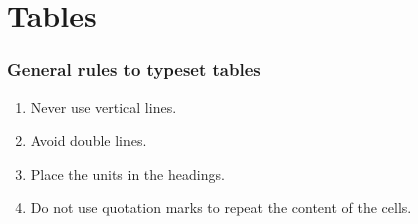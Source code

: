 \documentclass{beamer}
\begin{document}
	\section{Tables}
	\begin{frame}
		\frametitle{General rules to typeset tables}
			\begin{enumerate}
				\item Never use vertical lines.
				\item Avoid double lines.
				\item Place the units in the headings.
				\item Do not use quotation marks to repeat the content of the cells.
			\end{enumerate}
	\end{frame}
\end{document}
